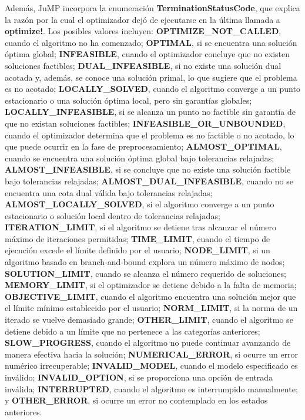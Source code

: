 Además, JuMP incorpora la enumeración \textbf{TerminationStatusCode}, que explica la razón por la cual el optimizador dejó de ejecutarse en la última llamada a \textbf{optimize!}. Los posibles valores incluyen: \textbf{OPTIMIZE\_NOT\_CALLED}, cuando el algoritmo no ha comenzado; \textbf{OPTIMAL}, si se encuentra una solución óptima global; \textbf{INFEASIBLE}, cuando el optimizador concluye que no existen soluciones factibles; \textbf{DUAL\_INFEASIBLE}, si no existe una solución dual acotada y, además, se conoce una solución primal, lo que sugiere que el problema es no acotado; \textbf{LOCALLY\_SOLVED}, cuando el algoritmo converge a un punto estacionario o una solución óptima local, pero sin garantías globales; \textbf{LOCALLY\_INFEASIBLE}, si se alcanza un punto no factible sin garantía de que no existan soluciones factibles; \textbf{INFEASIBLE\_OR\_UNBOUNDED}, cuando el optimizador determina que el problema es no factible o no acotado, lo que puede ocurrir en la fase de preprocesamiento; \textbf{ALMOST\_OPTIMAL}, cuando se encuentra una solución óptima global bajo tolerancias relajadas; \textbf{ALMOST\_INFEASIBLE}, si se concluye que no existe una solución factible bajo tolerancias relajadas; \textbf{ALMOST\_DUAL\_INFEASIBLE}, cuando no se encuentra una cota dual válida bajo tolerancias relajadas; \textbf{ALMOST\_LOCALLY\_SOLVED}, si el algoritmo converge a un punto estacionario o solución local dentro de tolerancias relajadas; \textbf{ITERATION\_LIMIT}, si el algoritmo se detiene tras alcanzar el número máximo de iteraciones permitidas; \textbf{TIME\_LIMIT}, cuando el tiempo de ejecución excede el límite definido por el usuario; \textbf{NODE\_LIMIT}, si un algoritmo basado en branch-and-bound explora un número máximo de nodos; \textbf{SOLUTION\_LIMIT}, cuando se alcanza el número requerido de soluciones; \textbf{MEMORY\_LIMIT}, si el optimizador se detiene debido a la falta de memoria; \textbf{OBJECTIVE\_LIMIT}, cuando el algoritmo encuentra una solución mejor que el límite mínimo establecido por el usuario; \textbf{NORM\_LIMIT}, si la norma de un iterado se vuelve demasiado grande; \textbf{OTHER\_LIMIT}, cuando el algoritmo se detiene debido a un límite que no pertenece a las categorías anteriores; \textbf{SLOW\_PROGRESS}, cuando el algoritmo no puede continuar avanzando de manera efectiva hacia la solución; \textbf{NUMERICAL\_ERROR}, si ocurre un error numérico irrecuperable; \textbf{INVALID\_MODEL}, cuando el modelo especificado es inválido; \textbf{INVALID\_OPTION}, si se proporciona una opción de entrada inválida; \textbf{INTERRUPTED}, cuando el algoritmo es interrumpido manualmente; y \textbf{OTHER\_ERROR}, si ocurre un error no contemplado en los estados anteriores.

